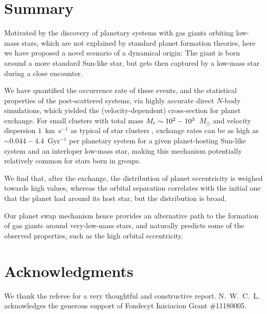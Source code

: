 \documentclass[twocolumn]{aastex62}
\begin{document}
\section{Summary}
Motivated by the discovery of planetary systems with gas giants orbiting low-mass stars, which are not explained 
by standard planet formation theories, here we have proposed a novel scenario of a dynamical origin:  The giant is born around a more standard Sun-like star, but gets then captured by a low-mass star during a close encounter. 

We have quantified the occurrence rate of these events, and the statistical properties of the post-scattered systems, via 
highly accurate direct $N$-body simulations, which yielded the (velocity-dependent) cross-section for planet exchange.
For small clusters with total mass $M_{\rm c}\sim10^2-10^3$~$M_\odot$ and
velocity dispersion $1$~km~s$^{-1}$
as typical of star clusters \citep{Adams2001},
exchange rates can be as high as $\sim 0.044-4.4$~Gyr$^{-1}$ per planetary system for a given planet-hosting Sun-like system and an interloper low-mass star, making this mechanism potentially relatively common for stars born in groups.



We find that, after the exchange, the
distribution of planet eccentricity is weighed towards high values, whereas the
  orbital separation  correlates with the initial one that the planet had around its host star, but the distribution is broad.
  
  
  Our planet swap mechanism hence provides an alternative path to the formation of gas giants around very-low-mass stars, and naturally predicts some of the observed properties, such as the high orbital eccentricity.


\section*{Acknowledgments}

 We thank the referee for a very thoughtful
and constructive report.
N.~W.~C.~L. acknowledges the generous support of Fondecyt Iniciacion Grant \#11180005. 








\end{document}

